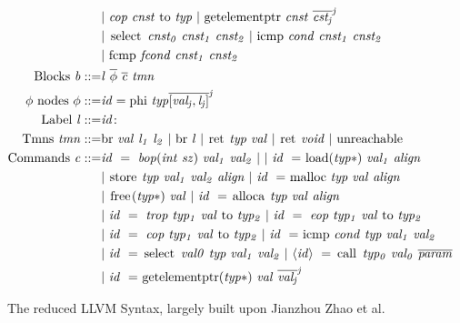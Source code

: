 \begin{figure}[!htb]
\begin{align*}
\begin{aligned}
&\mathit{|\ cop\ cnst\ }\kw{to}\mathit{\ typ\ |\ }\kw{getelementptr}\mathit{\ cnst\ \overline{cst_{j}}^{j}}\\
&\mathit{|\ }\kw{select}\mathit{\ cnst_{0}\ cnst_{1}\ cnst_{2}\ |\ }\kw{icmp}\mathit{\ cond\ cnst_{1}\ cnst_{2}}\\
&\mathit{|\ }\kw{fcmp}\mathit{\ fcond\ cnst_{1}\ cnst_{2}}\\
%
%
\text{Blocks } \mathit{b} ::= &\mathit{l\ \overline{\phi}\ \overline{c}\ tmn} \\
\phi\ \text{nodes } \phi ::= &\mathit{id} = \kw{phi}\ \mathit{typ \overline{[val_{j} , l_{j} ]}^{j}}\\
\text{Label } \mathit{l} ::= & \mathit{id}\kw{:}\\
\text{Tmns } \mathit{tmn} ::= &\kw{br}\mathit{\ val\ l_{1}\ l_{2} \ |\ }\kw{br}\mathit{\ l \ |\ }\kw{ret}\mathit{\ typ\ val\ |\ }\kw{ret}\mathit{\ void\ |\ }\kw{unreachable} \\
\text{Commands } \mathit{c} ::= &\mathit{id\ =\ bop(int\ sz)\ val_{1}\ val_{2}\ |\ }
\mathit{|\ id\ =\ }\kw{load}\mathit{(typ*)\ val_{1}\ align}\\
&\mathit{|\ }\kw{store}\mathit{\ typ\ val_{1}\ val_{2}\ align\ |\ id\ =\ }\kw{malloc}
\mathit{\ typ\ val\ align}\\
&\mathit{|\ }\kw{free}\mathit{(typ * )\ val\ |\ id\ =\ }\kw{alloca}\mathit{\ typ\ val\ align}\\
&\mathit{|\ id\ =\ trop\ typ_{1}\ val\ }\kw{to}\mathit{\ typ_{2}\ |\ id\ =\ eop\ typ_{1}\ val\ }\kw{to}\mathit{\ typ_{2}}\\
&\mathit{|\ id\ =\ cop\ typ_{1}\ val\ }\kw{to}\mathit{\ typ_{2}}
\mathit{\ |\ id\ =\ } \kw{icmp}\mathit{\ cond\ typ\ val_{1}\ val_{2}}\\
&|\ \mathit{id\ =\ }\kw{select}\mathit{\ val0\ typ\ val_{1}\ val_{2}\ }
\mathit{|\ \langle id\rangle\ =\ }\kw{call}\mathit{\ typ_{0}\ val_{0}\ \overline{param}}\\
&\mathit{|\ id\ =\ }\kw{getelementptr}\mathit{(typ*)\ val\ \overline{val_{j}}^{j}}
\end{aligned}
\end{align*}
\caption[Syntax: LLVM]{The reduced LLVM Syntax, largely built upon Jianzhou Zhao et al.~\cite{Zhao:2012:FLI:2103656.2103709} \label{fig:LLVMSyntax}}
\end{figure}

